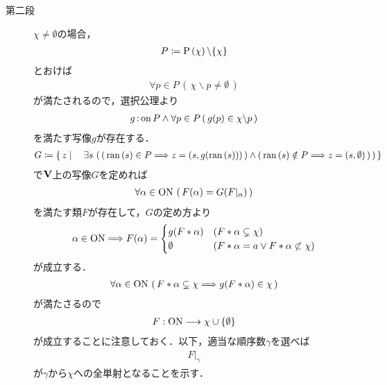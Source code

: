 \begin{prf}
\begin{description}
			\item[第二段]
				$\chi \neq \emptyset$の場合，
				\begin{align}
					P \coloneqq \operatorname*{P} \left(\chi\right) \backslash \{\chi\}
				\end{align}
				とおけば
				\begin{align}
					\forall p \in P\, (\, \chi \backslash p \neq \emptyset\, )
				\end{align}
				が満たされるので，選択公理より
				\begin{align}
					g \operatorname*{:on} P \wedge \forall p \in P\, (\, g(p) \in \chi \backslash p\, ) 
				\end{align}
				を満たす写像$g$が存在する．
				\begin{align}
					G \coloneqq \left\{\, z \mid \quad \exists s\, \left(\, 
						\left(\, \operatorname*{ran} \left(s\right) \in P \Longrightarrow z=(s,g(\operatorname*{ran} \left(s\right)))\, \right) 
						\wedge \left(\, \operatorname*{ran} \left(s\right) \notin P \Longrightarrow z=(s,\emptyset)\, \right)\, \right)\, \right\}
				\end{align}
				で$\mathbf{V}$上の写像$G$を定めれば
				\begin{align}
					\forall \alpha \in \mathrm{ON}\, \left(\, F(\alpha) = G(F|_\alpha)\, \right)
				\end{align}
				を満たす類$F$が存在して，$G$の定め方より
				\begin{align}
					\alpha \in \mathrm{ON} \Longrightarrow F(\alpha) = 
					\begin{cases}
						g(F \ast \alpha) & (F \ast \alpha \subsetneq \chi) \\
						\emptyset & (F \ast \alpha = a \vee F \ast \alpha \not\subset \chi)
					\end{cases}
				\end{align}
				が成立する．
				\begin{align}
					\forall \alpha \in \mathrm{ON}\, \left(\, 
					F \ast \alpha \subsetneq \chi \Longrightarrow g(F \ast \alpha) \in \chi\, \right)
				\end{align}
				が満たさるので
				\begin{align}
					F:\mathrm{ON} \longrightarrow \chi \cup \{\emptyset\}
				\end{align}
				が成立することに注意しておく．以下，適当な順序数$\gamma$を選べば
				\begin{align}
					F|_\gamma
				\end{align}
				が$\gamma$から$\chi$への全単射となることを示す．
			

\end{description}
\end{prf}
